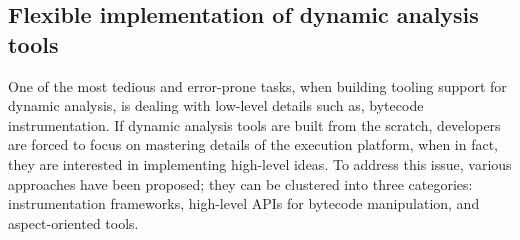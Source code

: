 \subsection{Flexible implementation of dynamic analysis tools}

One of the most tedious and error-prone tasks, when building tooling support for dynamic analysis, is dealing with low-level details such as, bytecode instrumentation.
If dynamic analysis tools are built from the scratch, developers are forced to focus on mastering details of the execution platform, when in fact, they are interested in implementing high-level ideas.
To address this issue, various approaches have been proposed; they can be clustered into three categories: instrumentation frameworks, high-level APIs for bytecode manipulation, and aspect-oriented tools.

